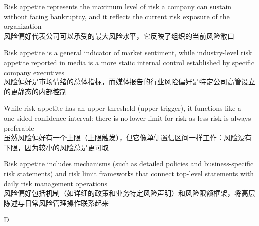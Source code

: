 \documentclass{article}
\begin{document}
\begin{choices}
    \item Risk appetite represents the maximum level of risk a company can sustain without facing bankruptcy, and it reflects the current risk exposure of the organization \\
    风险偏好代表公司可以承受的最大风险水平，它反映了组织的当前风险敞口
    
    \item Risk appetite is a general indicator of market sentiment, while industry-level risk appetite reported in media is a more static internal control established by specific company executives \\
    风险偏好是市场情绪的总体指标，而媒体报告的行业风险偏好是特定公司高管设立的更静态的内部控制
    
    \item While risk appetite has an upper threshold (upper trigger), it functions like a one-sided confidence interval: there is no lower limit for risk as less risk is always preferable \\
    虽然风险偏好有一个上限（上限触发），但它像单侧置信区间一样工作：风险没有下限，因为较小的风险总是更可取
    
    \item Risk appetite includes mechanisms (such as detailed policies and business-specific risk statements) and risk limit frameworks that connect top-level statements with daily risk management operations \\
    风险偏好包括机制（如详细的政策和业务特定风险声明）和风险限额框架，将高层陈述与日常风险管理操作联系起来
\end{choices}

\begin{correctanswer}
    D
\end{correctanswer}
\end{document}

